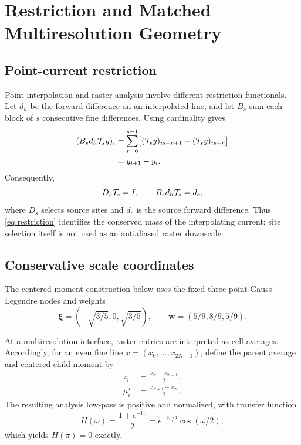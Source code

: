 \section{Restriction and Matched Multiresolution Geometry}

\subsection{Point-current restriction}

Point interpolation and raster analysis involve different restriction
functionals. Let \(d_h\) be the forward difference on an interpolated line,
and let \(B_s\) sum each block of \(s\) consecutive fine differences. Using
cardinality gives
\begin{align}
 (B_s d_h\mathcal{T}_s y)_i
 &=\sum_{r=0}^{s-1}
 \bigl[(\mathcal{T}_s y)_{is+r+1}-(\mathcal{T}_s y)_{is+r}\bigr]\nonumber\\
 &=y_{i+1}-y_i.
 \label{eq:telescoping}
\end{align}
Consequently,
\begin{equation}
 D_s\mathcal{T}_s=I,\qquad B_s d_h\mathcal{T}_s=d_c,
 \label{eq:restriction}
\end{equation}
where \(D_s\) selects source sites and \(d_c\) is the source forward
difference. Thus \eqref{eq:restriction} identifies the conserved mass of the
interpolating current; site selection itself is not used as an antialiased
raster downscale.

\subsection{Conservative scale coordinates}

The centered-moment construction below uses the fixed three-point
Gauss--Legendre nodes and weights
\begin{equation}
 \bm\xi=(-\sqrt{3/5},0,\sqrt{3/5}),\qquad
 \bm w=(5/9,8/9,5/9).
 \label{eq:gauss3}
\end{equation}

At a multiresolution interface, raster entries are interpreted as cell
averages. Accordingly, for an even fine line
\(x=(x_0,\ldots,x_{2N-1})\), define the parent average and centered child
moment by
\begin{align}
 z_i&=\frac{x_{2i}+x_{2i+1}}{2},
 \label{eq:scaleaverage}\\
 \mu_i^\star&=\frac{x_{2i+1}-x_{2i}}{2}.
 \label{eq:actualmoment}
\end{align}
The resulting analysis low-pass is positive and normalized, with transfer
function
\begin{equation}
 H(\omega)=\frac{1+e^{-\mathrm i\omega}}{2}
 =e^{-\mathrm i\omega/2}\cos(\omega/2),
 \label{eq:nyquistresponse}
\end{equation}
which yields \(H(\pi)=0\) exactly.

